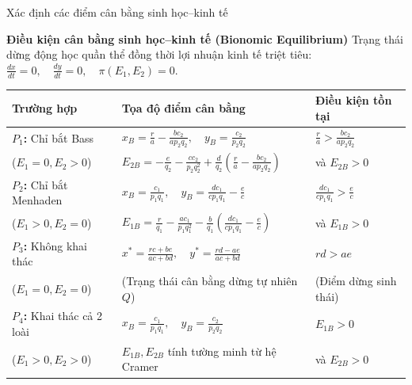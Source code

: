 \documentclass[aspectratio=169, 10pt]{beamer}
\begin{document}
\begin{frame}{Xác định các điểm cân bằng sinh học--kinh tế}
  \vspace*{-0.25cm}
  \begin{block}{\textbf{Điều kiện cân bằng sinh học--kinh tế (Bionomic Equilibrium)}}
    \footnotesize
    Trạng thái dừng động học quần thể đồng thời lợi nhuận kinh tế triệt tiêu:
    $\frac{dx}{dt} = 0, \quad \frac{dy}{dt} = 0, \quad \pi(E_1, E_2) = 0$.
  \end{block}

  \vspace{0.05cm}

  \begin{center}
  \scriptsize
  \renewcommand{\arraystretch}{1.02}
  \begin{tabularx}{\textwidth}{l X X}
    \toprule
    \textbf{Trường hợp} & \textbf{Tọa độ điểm cân bằng} & \textbf{Điều kiện tồn tại} \\
    \midrule
    \textbf{$P_1$:} Chỉ bắt Bass & $x_B = \frac{r}{a} - \frac{bc_2}{ap_2q_2}, \quad y_B = \frac{c_2}{p_2q_2}$ & $\frac{r}{a} > \frac{bc_2}{ap_2q_2}$ \\
    ($E_1 = 0, E_2 > 0$) & $E_{2B} = -\frac{e}{q_2} - \frac{cc_2}{p_2q_2^2} + \frac{d}{q_2}\left(\frac{r}{a} - \frac{bc_2}{ap_2q_2}\right)$ & và $E_{2B} > 0$ \\
    \midrule
    \textbf{$P_2$:} Chỉ bắt Menhaden & $x_B = \frac{c_1}{p_1q_1}, \quad y_B = \frac{dc_1}{cp_1q_1} - \frac{e}{c}$ & $\frac{dc_1}{cp_1q_1} > \frac{e}{c}$ \\
    ($E_1 > 0, E_2 = 0$) & $E_{1B} = \frac{r}{q_1} - \frac{ac_1}{p_1q_1^2} - \frac{b}{q_1}\left(\frac{dc_1}{cp_1q_1} - \frac{e}{c}\right)$ & và $E_{1B} > 0$ \\
    \midrule
    \textbf{$P_3$:} Không khai thác & $x^* = \frac{rc+be}{ac+bd}, \quad y^* = \frac{rd-ae}{ac+bd}$ & $rd > ae$ \\
    ($E_1 = 0, E_2 = 0$) & (Trạng thái cân bằng dừng tự nhiên $Q$) & (Điểm dừng sinh thái) \\
    \midrule
    \textbf{$P_4$:} Khai thác cả 2 loài & $x_B = \frac{c_1}{p_1q_1}, \quad y_B = \frac{c_2}{p_2q_2}$ & $E_{1B} > 0$ \\
    ($E_1 > 0, E_2 > 0$) & $E_{1B}, E_{2B}$ tính tường minh từ hệ Cramer & và $E_{2B} > 0$ \\
    \bottomrule
  \end{tabularx}
  \end{center}
\end{frame}
\end{document}
